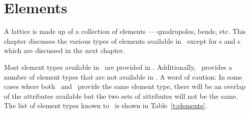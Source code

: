 \chapter{Elements}
\label{c:elements}

A lattice is made up of a collection of
elements --- quadrupoles, bends, etc. This chapter discusses the
various types of elements available in \bmad\ except for s
and s which are discussed in the next chapter.

Most element types available in \mad\ are provided in \bmad.
Additionally, \bmad\ provides a number of element types that are not
available in \mad.  A word of caution: In some cases where both \mad\
and \bmad\ provide the same element type, there will be an overlap of 
the attributes available but the two sets of attributes will not be the same.
The list of element types known to \bmad\ is shown in Table~\ref{t:elements}.

